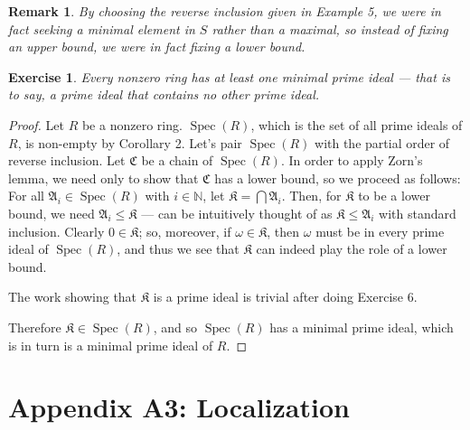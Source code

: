\documentclass[12pt,reqno]{amsart}
\theoremstyle{plain}
\newtheorem{exercise}{Exercise}
\newtheorem{rem}{Remark}
\DeclareMathOperator{\spec}{Spec}
\newcommand{\nn}{\mathbb N}
\newcommand{\idealA}{\mathfrak{A}}
\newcommand{\C}{\mathfrak{C}}
\begin{document}
\begin{rem} By choosing the reverse inclusion given in Example 5, we were in fact seeking a minimal element in $S$ rather than a maximal, so instead of fixing an upper bound, we were in fact fixing a lower bound. 
\end{rem}
\begin{exercise} Every nonzero ring has at least one minimal prime ideal — that is to say, a prime ideal that contains no other prime ideal. 
\end{exercise} 
\begin{proof}
Let $R$ be a nonzero ring. $\spec (R)$, which is the set of all prime ideals of $R$, is non-empty by Corollary 2. Let's pair $\spec (R)$ with the partial order of reverse inclusion. 
Let $\C$ be a chain of $\spec(R)$. In order to apply Zorn's lemma, we need only to show that $\C$ has a lower bound, so we proceed as follows: For all $\idealA_i \in \spec (R)$ with $i \in \nn$, let $\mathfrak{K} = \bigcap \idealA_i$. Then, for $\mathfrak{K}$ to be a lower bound, we need $ \idealA_i \leq \mathfrak{K}$ — can be intuitively thought of as $\mathfrak{K} \leq \idealA_i$ with standard inclusion. Clearly $0 \in \mathfrak{K}$; so, moreover, if $\omega \in \mathfrak{K}$, then $\omega$ must be in every prime ideal of $\spec (R)$, and thus we see that $\mathfrak{K}$ can indeed play the role of a lower bound. 

The work showing that $\mathfrak{K}$ is a prime ideal is trivial after doing Exercise 6. 

Therefore $\mathfrak{K} \in \spec(R)$, and so $\spec(R)$ has a minimal prime ideal, which is in turn is a minimal prime ideal of $R$.  
\end{proof}
\section{Appendix A3: Localization}
\end{document}
